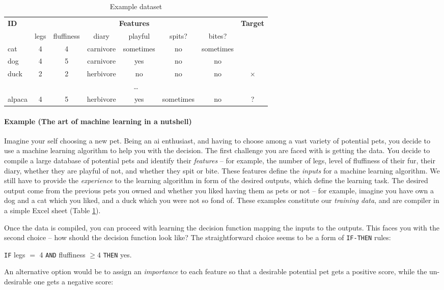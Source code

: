 \begin{table}
	\centering
	\caption{Example dataset}
	\begin{tabular}{@{}lccccccc@{}}
		\toprule
		\textbf{ID} &\multicolumn{6}{c}{\textbf{Features}} 									& \textbf{Target} \\
		\cmidrule(lr){2-7} 
					& legs	& fluffiness		& diary 		& playful	& spits? 	& bites? 	&	\\
		\midrule
		cat			& 4		& 4				& carnivore	& sometimes & no		 	& sometimes	&  \checkmark \\
		dog			& 4		& 5				& carnivore	& yes		& no		& no		& \checkmark \\
		duck		& 2		& 2				& herbivore	& no			& no		& no		& $\times$ \\
		\multicolumn{8}{c}{\ldots} \\
		alpaca		& 4		& 5				& herbivore & yes		& sometimes	& no		& ? \\
		\bottomrule
	\end{tabular}
	\label{tab:pets}
\end{table}


\paragraph{Example (The art of machine learning in a nutshell)} Imagine your self choosing a new pet.
Being an \gls{ai} enthusiast, and having to choose among a vast variety of potential pets, you decide to use a machine learning algorithm to help you with the decision.
The first challenge you are faced with  is getting the data.
You decide to compile a large database of potential pets and identify their \textit{features} -- for example, the number of legs, level of fluffiness of their fur, their diary, whether they are playful of not, and whether they spit or bite.
These features define the \textit{inputs} for a machine learning algorithm.
We still have to provide the \textit{experience} to the learning algorithm in form of the desired outputs, which define the learning task.
The desired output come from the previous pets you owned and whether you liked having them as pets or not -- for example, imagine you have own a dog and a cat which you liked, and a duck which you were not so fond of.
These examples constitute our \textit{training data}, and are compiler in a simple Excel sheet (Table \ref{tab:pets}).



Once the data is compiled, you can proceed with learning the decision function mapping the inputs to the outputs.
This faces you with the second choice -- how should the decision function look like?
The straightforward choice seems to be a form of \texttt{IF-THEN} rules:
\begin{center}
	\texttt{IF} legs $=$ 4 \texttt{AND} fluffiness $\geq 4$ \texttt{THEN} yes.
\end{center}
An alternative option would be to assign an \textit{importance} to each feature so that a desirable potential pet gets a positive score, while the un-desirable one gets a negative score:

